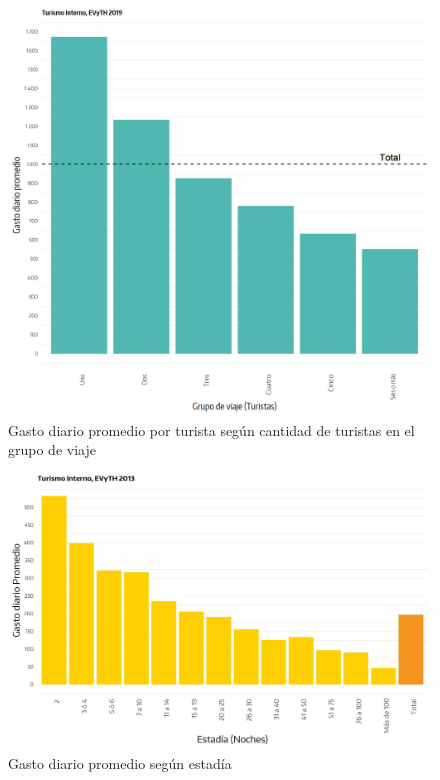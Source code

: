 \documentclass[
]{book}
\begin{document}
\begin{figure}

{\centering \includegraphics[width=1\linewidth,height=1\textheight]{imagenes/grafico_18a} 

}

\caption{Gasto diario promedio por turista según cantidad de turistas en el grupo de viaje}\label{fig:grafico18a}
\end{figure}

\begin{figure}

{\centering \includegraphics[width=1\linewidth,height=1\textheight]{imagenes/DT4_grafico18_b} 

}

\caption{Gasto diario promedio según estadía}\label{fig:grafico18b}
\end{figure}
\end{document}
